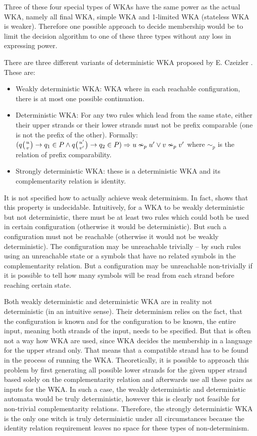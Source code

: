 Three of these four special types of WKAs have the same power as the actual WKA, namely all final WKA, simple WKA and 1-limited WKA (stateless WKA is weaker). Therefore one possible approach to decide membership would be to limit the decision algorithm to one of these three types without any loss in expressing power.

There are three different variants of deterministic WKA proposed by E. Czeizler \cite{DETERM_WKA}. These are:
\begin{itemize}
  \item{Weakly deterministic WKA: WKA where in each reachable configuration, there is at most one possible continuation.}
  \item{Deterministic WKA: For any two rules which lead from the same state, either their upper strands or their lower strands must not be prefix comparable (one is not the prefix of the other). Formally: $(q \wkpair{u}{v} \rightarrow q_1 \in P \wedge q \wkpair{u'}{v'} \rightarrow q_2 \in P) \Rightarrow u \nsim_p u' \vee v \nsim_p v'$ where $\sim_p$ is the relation of prefix comparability.}
  \item{Strongly deterministic WKA: these is a deterministic WKA and its complementarity relation is identity.}
\end{itemize}

It is not specified how to actually achieve weak determinism. In fact, \cite{DETERM_WKA} shows that this property is undecidable. Intuitively, for a WKA to be weakly deterministic but not deterministic, there must be at least two rules which could both be used in certain configuration (otherwise it would be deterministic). But such a configuration must not be reachable (otherwise it would not be weakly deterministic). The configuration may be unreachable trivially -- by such rules using an unreachable state or a symbols that have no related symbols in the complementarity relation. But a configuration may be unreachable non-trivially if it is possible to tell how many symbols will be read from each strand before reaching certain state.

Both weakly deterministic and deterministic WKA are in reality not deterministic (in an intuitive sense). Their determinism relies on the fact, that the configuration is known and for the configuration to be known, the entire input, meaning both strands of the input, needs to be specified. But that is often not a way how WKA are used, since WKA decides the membership in a language for the upper strand only. That means that a compatible strand has to be found in the process of running the WKA. Theoretically, it is possible to approach this problem by first generating all possible lower strands for the given upper strand based solely on the complementarity relation and afterwards use all these pairs as inputs for the WKA. In such a case, the weakly deterministic and deterministic automata would be truly deterministic, however this is clearly not feasible for non-trivial complementarity relations. Therefore, the strongly deterministic WKA is the only one witch is truly deterministic under all circumstances because the identity relation requirement leaves no space for these types of non-determinism.

